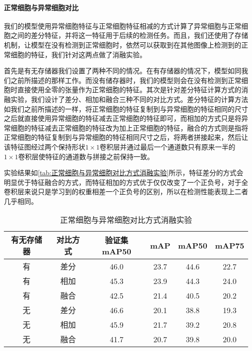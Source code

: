 \paragraph{正常细胞与异常细胞对比}
\par 我们的模型使用异常细胞特征与正常细胞特征相减的方式计算了异常细胞与正常细胞之间的差分特征，并将这一特征用于后续的检测任务。而且，我们还使用了存储机制，让模型在没有检测到正常细胞时，依然可以获取到在其他图像上检测到的正常细胞的特征，我们针对这两点做了消融实验。
\par 首先是有无存储器我们设置了两种不同的情况。在有存储器的情况下，模型如同我们之前所描述的那样工作。而没有储存器时，我们的模型则会在没有检测到正常细胞时直接使用全零的张量作为正常细胞的特征。其次是针对差分特征计算方式的消融实验，我们设计了差分、相加和融合三种不同的对比方式。差分特征的计算方法如我们之前所描述的一样，将正常细胞的特征复制到与异常细胞的特征相同的尺寸之后就直接使用异常细胞的特征减去正常细胞的特征即可，而相加的方式只是将异常细胞的特征减去正常细胞的特征改为加上正常细胞的特征，融合的方式则是指将正常细胞的特征复制到与异常细胞的特征相同尺寸之后，将两者拼接起来，然后让该特征图经过两个保持形状$1\times 1$卷积层并通过最后一个通道数只有原来一半的$1\times 1$卷积层使特征的通道数与拼接之前保持一致。
\par 实验结果如\autoref{tab:正常细胞与异常细胞对比方式消融实验}所示，特征差分的方式会明显优于特征融合的方式，而特征相加的方式优于仅仅改变了一个正负号，对于全卷积层来说只是学习到的权重相差一个正负号的区别，所以在检测性能表现上二者几乎相同。

\begin{table}[htbp]
    \centering
    \caption{正常细胞与异常细胞对比方式消融实验}
    \begin{tabular}{|c|c|c|c|c|c|}
        \hline
        有无存储器 & 对比方式 & 验证集mAP50 & mAP  & mAP50 & mAP75 \\ \hline
        有         & 差分     & 46.0        & 23.7 & 44.6  & 22.7  \\ \hline
        有         & 相加     & 45.3        & 23.9 & 44.3  & 24.0  \\ \hline
        有         & 融合     & 42.5        & 21.4 & 40.5  & 20.2  \\ \hline
        无         & 差分     & 46.6        & 20.1 & 38.8  & 19.3  \\ \hline
        无         & 相加     & 45.9        & 21.7 & 39.2  & 20.8  \\ \hline
        无         & 融合     & 41.7        & 20.7 & 39.8  & 20.0  \\ \hline
    \end{tabular}
    \label{tab:正常细胞与异常细胞对比方式消融实验}
\end{table}


